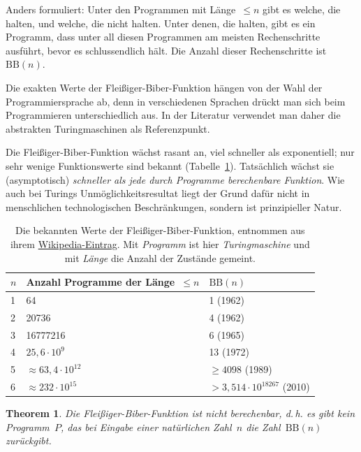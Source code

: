 \documentclass[twoside]{../zirkelblatt1415}
\theoremstyle{definition}
\theoremstyle{plain}
\newtheorem{thm}[defn]{Theorem}
\theoremstyle{remark}
\newcommand{\BB}{\mathrm{BB}}
\begin{document}
Anders formuliert: Unter den Programmen mit Länge~$\leq n$ gibt es welche, die
halten, und welche, die nicht halten. Unter denen, die halten, gibt es ein
Programm, dass unter all diesen Programmen am meisten Rechenschritte ausführt,
bevor es schlussendlich hält. Die Anzahl dieser Rechenschritte ist~$\BB(n)$.

Die exakten Werte der Fleißiger-Biber-Funktion hängen von der Wahl der
Programmiersprache ab, denn in verschiedenen Sprachen drückt man sich beim
Programmieren unterschiedlich aus. In der Literatur verwendet man daher die
abstrakten Turingmaschinen als Referenzpunkt.

Die Fleißiger-Biber-Funktion wächst rasant an, viel schneller als exponentiell;
nur sehr wenige Funktionswerte sind bekannt (Tabelle~\ref{tab:bb}). Tatsächlich
wächst sie (asymptotisch) \emph{schneller als jede durch Programme berechenbare
Funktion}. Wie auch bei Turings Unmöglichkeitsresultat liegt der Grund dafür
nicht in menschlichen technologischen Beschränkungen, sondern ist
prinzipieller Natur.

\begin{table}[b]
  \begin{tabular}{@{}lll@{}}
    $n$ & Anzahl Programme der Länge~$\leq n$ & $\BB(n)$ \\\midrule
    1 & 64 & 1 (1962) \\
    2 & 20736 & 4 (1962) \\
    3 & 16777216 & 6 (1965) \\
    4 & $25{,}6 \cdot 10^9$ & 13 (1972) \\
    5 & $\approx 63{,}4 \cdot 10^{12}$ & $\geq 4098$ (1989) \\
    6 & $\approx 232 \cdot 10^{15}$ & $> 3{,}514 \cdot 10^{18267}$ (2010) \\
  \end{tabular}
  \centering
  \caption{\label{tab:bb}Die bekannten Werte der Fleißiger-Biber-Funktion,
  entnommen aus ihrem
  \href{http://de.wikipedia.org/wiki/Fleißiger_Biber}{Wikipedia-Eintrag}. Mit
  \emph{Programm} ist hier \emph{Turingmaschine} und mit \emph{Länge}
  die Anzahl der Zustände gemeint.}
\end{table}

\begin{thm}Die Fleißiger-Biber-Funktion ist nicht berechenbar, d.\,h. es gibt
kein Programm~$P$, das bei Eingabe einer natürlichen Zahl~$n$ die Zahl~$\BB(n)$
zurückgibt.\end{thm}
\end{document}
